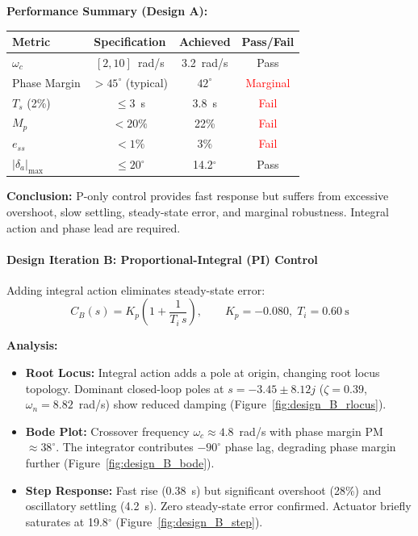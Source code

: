 \textbf{Performance Summary (Design A):}
\begin{center}
\begin{tabular}{lccc}
\hline
\textbf{Metric} & \textbf{Specification} & \textbf{Achieved} & \textbf{Pass/Fail} \\
\hline
$\omega_c$ & $[2,10]$~rad/s & 3.2~rad/s & \textcolor{green!60!black}{Pass} \\
Phase Margin & $>45^\circ$ (typical) & $42^\circ$ & \textcolor{red}{Marginal} \\
$T_s$ (2\%) & $\le 3$~s & 3.8~s & \textcolor{red}{Fail} \\
$M_p$ & $<20\%$ & 22\% & \textcolor{red}{Fail} \\
$e_{ss}$ & $<1\%$ & 3\% & \textcolor{red}{Fail} \\
$|\delta_a|_{\max}$ & $\le 20^\circ$ & 14.2$^\circ$ & \textcolor{green!60!black}{Pass} \\
\hline
\end{tabular}
\end{center}

\textbf{Conclusion:} P-only control provides fast response but suffers from excessive overshoot, slow settling, steady-state error, and marginal robustness. Integral action and phase lead are required.

\paragraph{Design Iteration B: Proportional-Integral (PI) Control}

Adding integral action eliminates steady-state error:
\begin{equation}
C_B(s) = K_p\left(1 + \frac{1}{T_i\,s}\right), \qquad K_p = -0.080,\; T_i = 0.60~\text{s}
\label{eq:design_B}
\end{equation}

\textbf{Analysis:}
\begin{itemize}
\item \textbf{Root Locus:} Integral action adds a pole at origin, changing root locus topology. Dominant closed-loop poles at $s = -3.45 \pm 8.12j$ ($\zeta=0.39$, $\omega_n=8.82$~rad/s) show reduced damping (Figure~\ref{fig:design_B_rlocus}).
\item \textbf{Bode Plot:} Crossover frequency $\omega_c \approx 4.8$~rad/s with phase margin PM $\approx 38^\circ$. The integrator contributes $-90^\circ$ phase lag, degrading phase margin further (Figure~\ref{fig:design_B_bode}).
\item \textbf{Step Response:} Fast rise (0.38~s) but significant overshoot (28\%) and oscillatory settling (4.2~s). Zero steady-state error confirmed. Actuator briefly saturates at 19.8$^\circ$ (Figure~\ref{fig:design_B_step}).
\end{itemize}

